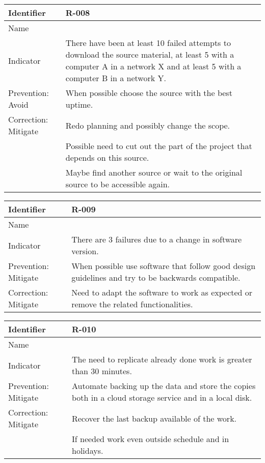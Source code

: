 \begin{table}[H]
	\begin{tabularx}{\textwidth}{|y|z|}
		\hline
		Identifier & \textbf{R-008} \\ \hline
		Name & \Rocho \\ \hline
		Indicator & There have been at least 10 failed attempts to download the source material, at least 5 with a computer A in a network X and at least 5 with a computer B in a network Y.\\ \hline
		Prevention: Avoid & When possible choose the source with the best uptime.\\ \hline
		Correction: Mitigate
			& Redo planning and possibly change the scope. \\
			& Possible need to cut out the part of the project that depends on this source. \\
			& Maybe find another source or wait to the original source to be accessible again.\\ \hline
	\end{tabularx}
\end{table}

\begin{table}[H]
	\begin{tabularx}{\textwidth}{|y|z|}
		\hline
		Identifier & \textbf{R-009} \\ \hline
		Name & \Rnueve \\ \hline
		Indicator & There are 3 failures due to a change in software version.\\ \hline
		Prevention: Mitigate & When possible use software that follow good design guidelines and try to be backwards compatible.\\ \hline
		Correction: Mitigate & Need to adapt the software to work as expected or remove the related functionalities. \\ \hline
	\end{tabularx}
\end{table}

\begin{table}[H]
	\begin{tabularx}{\textwidth}{|y|z|}
		\hline
		Identifier & \textbf{R-010} \\ \hline
		Name & \Rdiez \\ \hline
		Indicator & The need to replicate already done work is greater than 30 minutes.\\ \hline
		Prevention: Mitigate & Automate backing up the data and store the copies both in a cloud storage service and in a local disk.\\ \hline
		Correction: Mitigate
			& Recover the last backup available of the work. \\
			& If needed work even outside schedule and in holidays. \\ \hline
	\end{tabularx}
\end{table}

